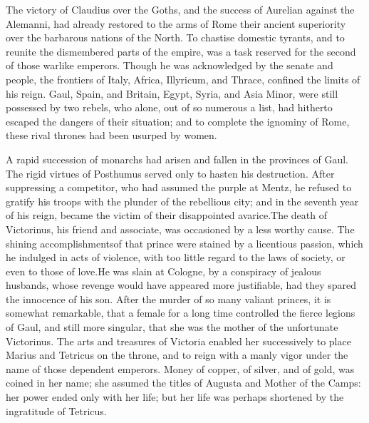 

The victory of Claudius over the Goths, and the success of
Aurelian against the Alemanni, had already restored to the arms
of Rome their ancient superiority over the barbarous nations of
the North. To chastise domestic tyrants, and to reunite the
dismembered parts of the empire, was a task reserved for the
second of those warlike emperors. Though he was acknowledged by
the senate and people, the frontiers of Italy, Africa, Illyricum,
and Thrace, confined the limits of his reign. Gaul, Spain, and
Britain, Egypt, Syria, and Asia Minor, were still possessed by
two rebels, who alone, out of so numerous a list, had hitherto
escaped the dangers of their situation; and to complete the
ignominy of Rome, these rival thrones had been usurped by women.

A rapid succession of monarchs had arisen and fallen in the
provinces of Gaul. The rigid virtues of Posthumus served only to
hasten his destruction. After suppressing a competitor, who had
assumed the purple at Mentz, he refused to gratify his troops
with the plunder of the rebellious city; and in the seventh year
of his reign, became the victim of their disappointed avarice.\footnotemark[46]
The death of Victorinus, his friend and associate, was occasioned
by a less worthy cause. The shining accomplishments\footnotemark[47] of that
prince were stained by a licentious passion, which he indulged in
acts of violence, with too little regard to the laws of society,
or even to those of love.\footnotemark[48] He was slain at Cologne, by a
conspiracy of jealous husbands, whose revenge would have appeared
more justifiable, had they spared the innocence of his son. After
the murder of so many valiant princes, it is somewhat remarkable,
that a female for a long time controlled the fierce legions of
Gaul, and still more singular, that she was the mother of the
unfortunate Victorinus. The arts and treasures of Victoria
enabled her successively to place Marius and Tetricus on the
throne, and to reign with a manly vigor under the name of those
dependent emperors. Money of copper, of silver, and of gold, was
coined in her name; she assumed the titles of Augusta and Mother
of the Camps: her power ended only with her life; but her life
was perhaps shortened by the ingratitude of Tetricus.\footnotemark[49]

